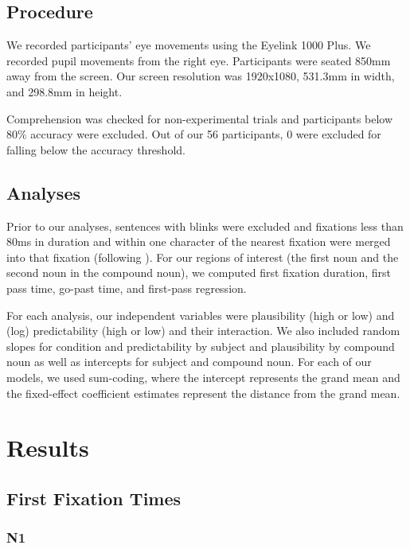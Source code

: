 \documentclass[
  letterpaper,
  DIV=11,
  numbers=noendperiod,
  nottoc]{scrreprt}
\begin{document}
\subsection{Procedure}\label{procedure}

We recorded participants' eye movements using the Eyelink 1000 Plus. We
recorded pupil movements from the right eye. Participants were seated
850mm away from the screen. Our screen resolution was 1920x1080, 531.3mm
in width, and 298.8mm in height.

Comprehension was checked for non-experimental trials and participants
below 80\% accuracy were excluded. Out of our 56 participants, 0 were
excluded for falling below the accuracy threshold.

\subsection{Analyses}\label{analyses}

Prior to our analyses, sentences with blinks were excluded and fixations
less than 80ms in duration and within one character of the nearest
fixation were merged into that fixation (following
). For
our regions of interest (the first noun and the second noun in the
compound noun), we computed first fixation duration, first pass time,
go-past time, and first-pass regression.

For each analysis, our independent variables were plausibility (high or
low) and (log) predictability (high or low) and their interaction. We
also included random slopes for condition and predictability by subject
and plausibility by compound noun as well as intercepts for subject and
compound noun. For each of our models, we used sum-coding, where the
intercept represents the grand mean and the fixed-effect coefficient
estimates represent the distance from the grand mean.

\section{Results}\label{results}

\subsection{First Fixation Times}\label{first-fixation-times}

\subsubsection{N1}\label{n1}
\end{document}
